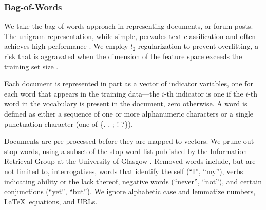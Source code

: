 \documentclass{edm_template}
\begin{document}
\vspace{-0.3cm}
\subsubsection{Bag-of-Words}
We take the bag-of-words approach in representing documents, or forum posts. The unigram representation, while simple, pervades text classification and often achieves high performance \cite{boulis2005text}. We employ $l_{2}$ regularization to prevent overfitting, a risk that is aggravated when the dimension of the feature space exceeds the training set size \cite{Ng:2004:FSL:1015330.1015435}.

Each document is represented in part as a vector of indicator variables, one for each word that appears in the training data---the $i$-th indicator is one if the $i$-th word in the vocabulary is present in the document, zero otherwise. A word is defined as either a sequence of one or more alphanumeric characters or a single punctuation character (one of \{. , ; ! ?\}). 

Documents are pre-processed before they are mapped to vectors. We prune out stop words, using a subset of the stop word list published by the Information Retrieval Group at the University of Glasgow \cite{glasgow}. Removed words include, but are not limited to, interrogatives, words that identify the self (``I'', ``my''), verbs indicating ability or the lack thereof, negative words (``never'', ``not''), and certain conjunctions (``yet'', ``but''). We ignore alphabetic case and lemmatize numbers, \LaTeX\ equations, and URLs.

\vspace{-0.3cm}
\end{document}

